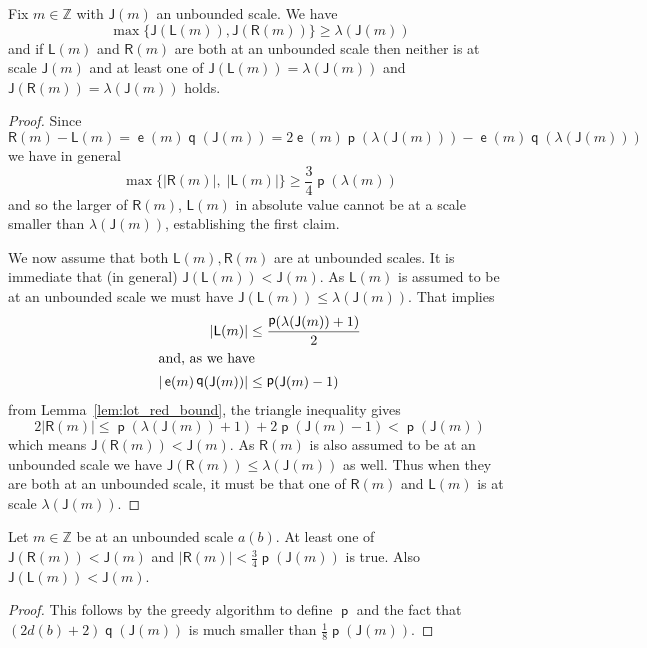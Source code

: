 \documentclass[AHL,Unicode,longabstracts,published]{cedram}
\DeclareMathOperator{\lst}{\mathsf{e}}
\DeclareMathOperator{\p}{\mathsf{p}}
\DeclareMathOperator{\q}{\mathsf{q}}
\newcommand{\Z}{\mathbb{Z}}
\newcommand{\lft}{\mathsf{L}}
\newcommand{\rht}{\mathsf{R}}
\newcommand{\scl}{\mathsf{J}}
\begin{document}
\begin{lemm}\label{lem: reduction not both small}
Fix $m \in \Z$ with $\scl(m)$ an unbounded scale. We have
\[
\max\{\scl(\lft(m)), \scl(\rht(m))\} \ge \lambda(\scl(m))
\]
and if $\lft(m)$ and $\rht(m)$ are both at an unbounded scale then neither is at scale $\scl(m)$ and at least one of $\scl(\lft(m)) = \lambda(\scl(m))$ and $\scl(\rht(m)) = \lambda(\scl(m))$ holds.
\end{lemm}
\begin{proof}
Since
\begin{equation}\label{eq:differnce in reduction}
\rht(m) - \lft(m) = \lst(m) \q(\scl(m)) = 2 \lst(m) \p(\lambda(\scl(m))) - \lst(m) \q(\lambda(\scl(m)))
\end{equation}
we have in general
\begin{equation}\label{eq:one correct}
\max\{|\rht(m)|,\;|\lft(m)|\}\geq \frac{3}{4} \p(\lambda(m))
\end{equation}
and so the larger of $\rht(m)$, $\lft(m)$ in absolute value cannot be at a scale smaller than $\lambda(\scl(m))$, establishing the first claim.

We now assume that both $\lft(m),\rht(m)$ are at unbounded scales. It is immediate that (in general) $\scl(\lft(m)) < \scl(m)$. As $\lft(m)$ is assumed to be at an unbounded scale we must have $\scl(\lft(m)) \le \lambda(\scl(m))$. That implies
\begin{align*}
|\lft(m)| &\le \frac{\p(\lambda(\scl(m))+1)}{2}
\\
\intertext{and, as we have}
|\lst(m) \q(\scl(m))| &\le \p(\scl(m)-1)
\end{align*}
from Lemma~\ref{lem:lot_red_bound}, the triangle inequality gives
\[
2|\rht(m)| \le \p(\lambda(\scl(m))+1) + 2\p(\scl(m)-1) < \p(\scl(m))
\]
which means $\scl(\rht(m)) < \scl(m)$. As $\rht(m)$ is also assumed to be at an unbounded scale we have $\scl(\rht(m)) \le \lambda(\scl(m))$ as well. Thus when they are both at an unbounded scale, it must be that one of $\rht(m)$ and $\lft(m)$ is at scale $\lambda(\scl(m))$.
\end{proof}

\begin{lemm}\label{lem:reduction LR}
Let $m \in \Z$ be at an unbounded scale $a(b)$. At least one of $\scl(\rht(m)) < \scl(m)$ and $|\rht(m)|<\frac{3}{4}\p(\scl(m))$ is true. Also $\scl(\lft(m)) < \scl(m)$.
\end{lemm}
\begin{proof}
This follows by the greedy algorithm to define $\p$ and the fact that $(2d(b)+2)\q(\scl(m))$ is much smaller than $\frac{1}{8} \p(\scl(m))$.
\end{proof}
\end{document}
